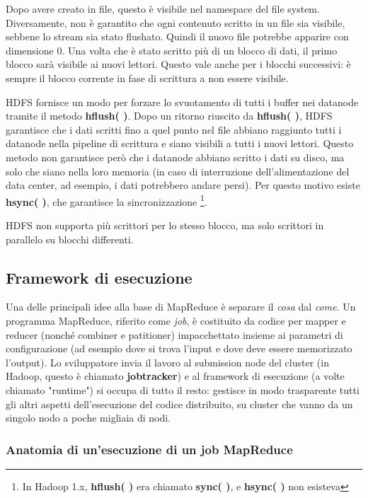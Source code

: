 \documentclass{article}
\begin{document}
Dopo avere creato in file, questo è visibile nel namespace del file system. Diversamente, non è garantito che ogni contenuto scritto in un file sia visibile, sebbene lo stream sia stato flushato. Quindi il nuovo file potrebbe apparire con dimensione 0. Una volta che è stato scritto più di un blocco di dati, il primo blocco sarà visibile ai nuovi lettori. Questo vale anche per i blocchi successivi: è sempre il blocco corrente in fase di scrittura a non essere visibile. 

HDFS fornisce un modo per forzare lo svuotamento di tutti i buffer nei datanode tramite il metodo \textbf{hflush( )}. Dopo un ritorno riuscito da \textbf{hflush( )}, HDFS garantisce che i dati scritti fino a quel punto nel file abbiano raggiunto tutti i datanode nella pipeline di scrittura e siano visibili a tutti i nuovi lettori. Questo metodo non garantisce però che i datanode abbiano scritto i dati su disco, ma solo che siano nella loro memoria (in caso di interruzione dell'alimentazione del data center, ad esempio, i dati potrebbero andare persi). Per questo motivo esiste \textbf{hsync( )}, che garantisce la sincronizzazione \footnote{In Hadoop 1.x, \textbf{hflush( )} era chiamato \textbf{sync( )}, e \textbf{hsync( )} non esisteva}.

HDFS non supporta più scrittori per lo stesso blocco, ma solo scrittori in parallelo su blocchi differenti.


\subsection{Framework di esecuzione}
Una delle principali idee alla base di MapReduce è separare il \textit{cosa} dal \textit{come}. Un programma MapReduce, riferito come \textit{job}, è costituito da codice per mapper e reducer (nonché combiner e patitioner) impacchettato insieme ai parametri di configurazione (ad esempio dove si trova l'input e dove deve essere memorizzato l'output). Lo sviluppatore invia il lavoro al submission node del cluster (in Hadoop, questo è chiamato \textbf{jobtracker}) e al framework di esecuzione (a volte chiamato "runtime") si occupa di tutto il resto: gestisce in modo trasparente tutti gli altri aspetti dell'esecuzione del codice distribuito, su cluster che vanno da un singolo nodo a poche migliaia di nodi.

\subsubsection{Anatomia di un'esecuzione di un job MapReduce}
\end{document}
